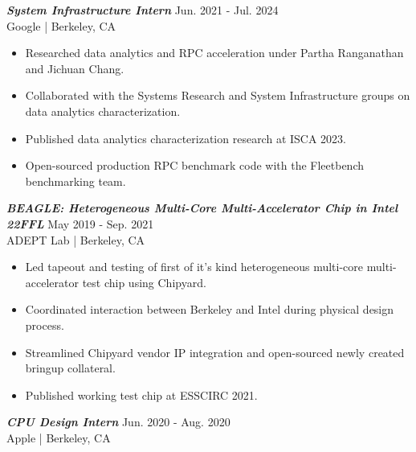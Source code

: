 \documentclass[letter]{res}
\begin{document}
\begin{resume}
\vspace{-2mm}

{\sl \textbf{System Infrastructure Intern}} \hfill Jun. 2021 - Jul. 2024\\
Google | Berkeley, CA \newline

 \vspace{-4mm}

 \begin{itemize}
 \item Researched data analytics and RPC acceleration under Partha Ranganathan and Jichuan Chang.
 \item Collaborated with the Systems Research and System Infrastructure groups on data analytics characterization.
 \item Published data analytics characterization research at ISCA 2023.
 \item Open-sourced production RPC benchmark code with the Fleetbench benchmarking team.
 \end{itemize}

\vspace{-2mm}

{\sl \textbf{BEAGLE: Heterogeneous Multi-Core Multi-Accelerator Chip in Intel 22FFL}} \hfill May 2019 - Sep. 2021\\
ADEPT Lab | Berkeley, CA \newline

 \vspace{-4mm}

 \begin{itemize}
 \item Led tapeout and testing of first of it's kind heterogeneous multi-core multi-accelerator test chip using Chipyard.
 \item Coordinated interaction between Berkeley and Intel during physical design process.
 \item Streamlined Chipyard vendor IP integration and open-sourced newly created bringup collateral.
 \item Published working test chip at ESSCIRC 2021.
 \end{itemize}

\vspace{-2mm}

{\sl \textbf{CPU Design Intern}} \hfill Jun. 2020 - Aug. 2020\\
Apple | Berkeley, CA \newline

 \vspace{-4mm}


\end{resume}
\end{document}
